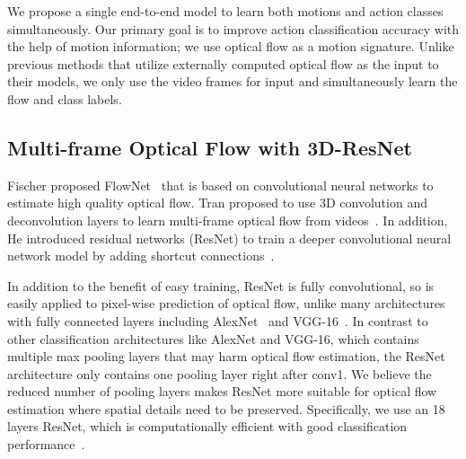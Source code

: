 \documentclass[10pt,twocolumn,letterpaper]{article}
\begin{document}

We propose a single end-to-end model to learn both motions and action classes simultaneously.
Our primary goal is to improve action classification accuracy with the help of motion information; we use optical flow as a motion signature.
Unlike previous methods that utilize externally computed optical flow as the input to their models, we only use the video frames for input and simultaneously learn the flow and class labels.

\subsection{Multi-frame Optical Flow with 3D-ResNet}%
Fischer \etal proposed FlowNet~\cite{FischerDIHHGSCB15} that is based on convolutional neural networks to estimate high quality optical flow. Tran \etal proposed to use 3D convolution and deconvolution layers to learn multi-frame optical flow from videos~\cite{tranbftp16}.
In addition, He \etal introduced residual networks (ResNet) to train a deeper convolutional neural network model by adding shortcut connections~\cite{heZRS15}.

In addition to the benefit of easy training, ResNet is fully convolutional, so is easily applied to pixel-wise prediction of optical flow, unlike many architectures with fully connected layers including AlexNet~\cite{krizhevskySH12} and VGG-16~\cite{simonyanZ14}.
In contrast to other classification architectures like AlexNet and VGG-16, which contains multiple max pooling layers that may harm optical flow estimation, the ResNet architecture only contains one pooling layer right after conv1.
We believe the reduced number of pooling layers makes ResNet more suitable for optical flow estimation where spatial details need to be preserved.
Specifically, we use an 18 layers ResNet, which is computationally efficient with good classification performance~\cite{heZRS15}.
\end{document}
